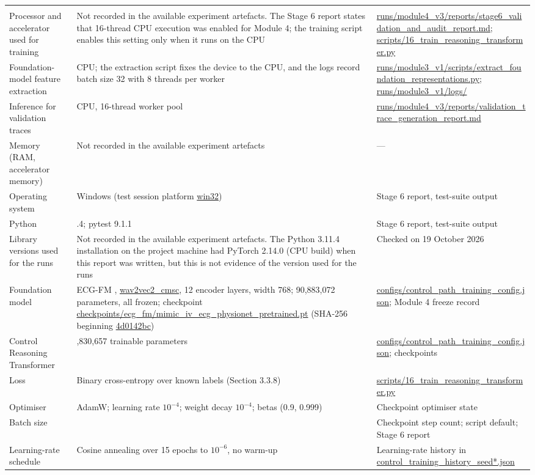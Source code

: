 {\begin{longtable}{|>{\raggedright\arraybackslash}p{}|>{\raggedright\arraybackslash}p{}|>{\raggedright\arraybackslash}p{}|}
\endhead
\hline
\multicolumn{3}{r}{} \\
\endfoot
\hline
\endlastfoot
Processor and accelerator used for training & Not recorded in the available experiment artefacts. The Stage 6 report states that 16-thread CPU execution was enabled for Module 4; the training script enables this setting only when it runs on the CPU & \url{runs/module4_v3/reports/stage6_validation_and_audit_report.md}; \url{scripts/16_train_reasoning_transformer.py} \\ \hline
Foundation-model feature extraction & CPU; the extraction script fixes the device to the CPU, and the logs record batch size 32 with 8 threads per worker & \url{runs/module3_v1/scripts/extract_foundation_representations.py}; \url{runs/module3_v1/logs/} \\ \hline
Inference for validation traces & CPU, 16-thread worker pool & \url{runs/module4_v3/reports/validation_trace_generation_report.md} \\ \hline
Memory (RAM, accelerator memory) & Not recorded in the available experiment artefacts & — \\ \hline
Operating system & Windows (test session platform \url{win32}) & Stage 6 report, test-suite output \\ \hline
Python & 3.11.4; pytest 9.1.1 & Stage 6 report, test-suite output \\ \hline
Library versions used for the runs & Not recorded in the available experiment artefacts. The Python 3.11.4 installation on the project machine had PyTorch 2.14.0 (CPU build) when this report was written, but this is not evidence of the version used for the runs & Checked on 19 October 2026 \\ \hline
Foundation model & ECG-FM \cite{MCKEEN2025ECGFM}, \url{wav2vec2_cmsc}, 12 encoder layers, width 768; 90,883,072 parameters, all frozen; checkpoint \url{checkpoints/ecg_fm/mimic_iv_ecg_physionet_pretrained.pt} (SHA-256 beginning \url{4d0142bc}) & \url{configs/control_path_training_config.json}; Module 4 freeze record \\ \hline
Control Reasoning Transformer & 1,830,657 trainable parameters & \url{configs/control_path_training_config.json}; checkpoints \\ \hline
Loss & Binary cross-entropy over known labels (Section 3.3.8) & \url{scripts/16_train_reasoning_transformer.py} \\ \hline
Optimiser & AdamW; learning rate $10^{-4}$; weight decay $10^{-4}$; betas (0.9, 0.999) & Checkpoint optimiser state \\ \hline
Batch size & 64 & Checkpoint step count; script default; Stage 6 report \\ \hline
Learning-rate schedule & Cosine annealing over 15 epochs to $10^{-6}$, no warm-up & Learning-rate history in \url{control_training_history_seed*.json} \\

\end{longtable}
}

